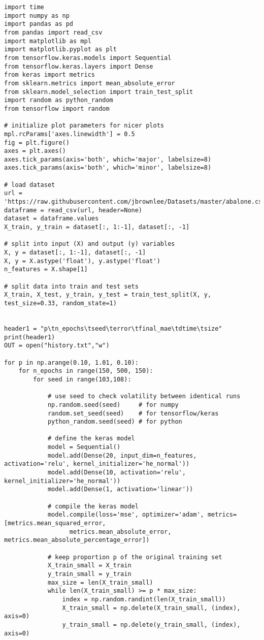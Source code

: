 \documentclass[oneside,10pt]{book}
\begin{document}
\begin{lstlisting}
import time
import numpy as np
import pandas as pd
from pandas import read_csv
import matplotlib as mpl
import matplotlib.pyplot as plt
from tensorflow.keras.models import Sequential
from tensorflow.keras.layers import Dense
from keras import metrics
from sklearn.metrics import mean_absolute_error
from sklearn.model_selection import train_test_split
import random as python_random
from tensorflow import random

# initialize plot parameters for nicer plots
mpl.rcParams['axes.linewidth'] = 0.5
fig = plt.figure()
axes = plt.axes()
axes.tick_params(axis='both', which='major', labelsize=8)
axes.tick_params(axis='both', which='minor', labelsize=8)

# load dataset
url = 'https://raw.githubusercontent.com/jbrownlee/Datasets/master/abalone.csv'
dataframe = read_csv(url, header=None)
dataset = dataframe.values
X_train, y_train = dataset[:, 1:-1], dataset[:, -1]

# split into input (X) and output (y) variables
X, y = dataset[:, 1:-1], dataset[:, -1]
X, y = X.astype('float'), y.astype('float')
n_features = X.shape[1]

# split data into train and test sets
X_train, X_test, y_train, y_test = train_test_split(X, y, test_size=0.33, random_state=1)


header1 = "p\tn_epochs\tseed\terror\tfinal_mae\tdtime\tsize"
print(header1)
OUT = open("history.txt","w")

for p in np.arange(0.10, 1.01, 0.10):
    for n_epochs in range(150, 500, 150):
        for seed in range(103,108):

            # use seed to check volatility between identical runs
            np.random.seed(seed)     # for numpy
            random.set_seed(seed)    # for tensorflow/keras
            python_random.seed(seed) # for python

            # define the keras model
            model = Sequential()
            model.add(Dense(20, input_dim=n_features, activation='relu', kernel_initializer='he_normal'))
            model.add(Dense(10, activation='relu', kernel_initializer='he_normal'))
            model.add(Dense(1, activation='linear'))

            # compile the keras model
            model.compile(loss='mse', optimizer='adam', metrics=[metrics.mean_squared_error,
                  metrics.mean_absolute_error, metrics.mean_absolute_percentage_error])

            # keep proportion p of the original training set
            X_train_small = X_train
            y_train_small = y_train
            max_size = len(X_train_small)
            while len(X_train_small) >= p * max_size:
                index = np.random.randint(len(X_train_small))
                X_train_small = np.delete(X_train_small, (index), axis=0)
                y_train_small = np.delete(y_train_small, (index), axis=0)


\end{lstlisting}
\end{document}
